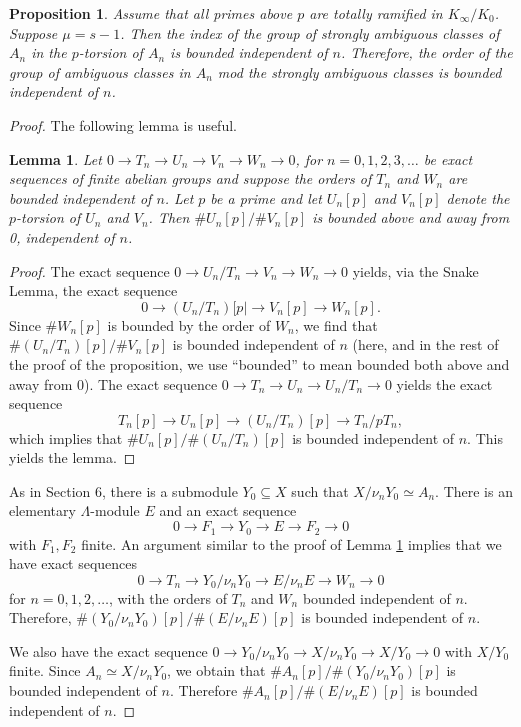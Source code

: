 \documentclass{amsart}
\newtheorem{proposition}[theorem]{Proposition}
\newtheorem{lemma}[theorem]{Lemma}
\begin{document}
\begin{proposition}\label{weakambig} Assume that all primes above $p$ are totally ramified in $K_{\infty}/K_0$. Suppose $\mu=s-1$. Then 
the index of the group of strongly ambiguous classes of $A_n$ in the
$p$-torsion of $A_n$ is bounded independent of $n$. Therefore, the order of the group of ambiguous classes in $A_n$ mod the strongly ambiguous
classes is bounded independent of $n$.
\end{proposition}
\begin{proof}
The following lemma is useful.
\begin{lemma}\label{fourterm} Let $0\to T_n\to U_n \to V_n\to W_n\to 0$, for $n=0, 1, 2, 3, \dots$ be exact sequences of finite abelian groups
and suppose the orders of $T_n$ and $W_n$ are bounded independent of $n$. Let $p$ be a prime and let $U_n[p]$ and $V_n[p]$ denote
the $p$-torsion of $U_n$ and $V_n$. Then $\#U_n[p] / \#V_n[p]$ is bounded above and away from 0, independent of $n$.
\end{lemma}
\begin{proof}
The exact sequence $0\to U_n/T_n \to V_n\to W_n\to 0$ yields, via the Snake Lemma, the exact sequence
$$
0\to (U_n/T_n)[p| \to V_n[p] \to W_n[p].
$$
Since $\#W_n[p]$ is bounded by the order of $W_n$, we find that $\#(U_n/T_n)[p] / \#V_n[p]$ is bounded independent of $n$
(here, and in the rest of the proof of the proposition, we use ``bounded'' to mean bounded both above and away from 0).
The exact sequence $0\to T_n\to U_n\to U_n/T_n\to 0$ yields the exact sequence
$$
T_n[p] \to U_n[p] \to (U_n/T_n)[p] \to T_n/pT_n,
$$
which implies that $\#U_n[p]/\#(U_n/T_n)[p]$ is bounded independent of $n$. 
This yields the lemma. \end{proof}


As in Section 6, there is a submodule $Y_0\subseteq X$ such that $X/\nu_nY_0\simeq A_n$. There is an elementary $\Lambda$-module
$E$ and an exact sequence
$$
0\to F_1\to Y_0 \to E \to F_2\to 0
$$
with $F_1, F_2$ finite. An argument similar to the proof of Lemma \ref{fourterm} implies that
we have exact sequences
$$
0\to T_n\to Y_0/\nu_nY_0 \to E/\nu_nE \to W_n\to 0
$$
for $n=0, 1,2, \dots$, with the orders of $T_n$ and $W_n$ bounded independent of $n$.
Therefore, $\#(Y_0/\nu_nY_0)[p]/\#(E/\nu_nE)[p]$ is bounded independent of $n$.

We also have the exact sequence $0\to Y_0/\nu_nY_0\to X/\nu_nY_0\to X/Y_0\to 0$ with $X/Y_0$ finite.
Since $A_n\simeq X/\nu_nY_0$, we obtain that
$\#A_n[p]/\#(Y_0/\nu_nY_0)[p]$ is bounded independent of $n$.
Therefore $\#A_n[p]/\#(E/\nu_nE)[p]$ is bounded independent of $n$.


\end{proof}
\end{document}
